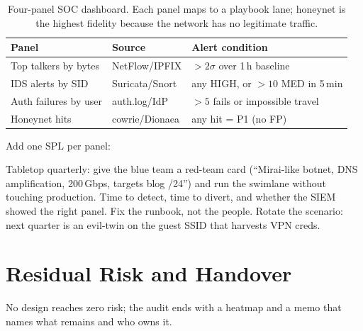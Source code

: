 \begin{table}[h]\centering\small
\begin{tabular}{l l l}
\toprule \textbf{Panel} & \textbf{Source} & \textbf{Alert condition} \\ \midrule
Top talkers by bytes & NetFlow/IPFIX & $>2\sigma$ over 1\,h baseline \\
IDS alerts by SID & Suricata/Snort & any HIGH, or $>10$ MED in 5\,min \\
Auth failures by user & auth.log/IdP & $>5$ fails or impossible travel \\
Honeynet hits & cowrie/Dionaea & any hit = P1 (no FP) \\ \bottomrule
\end{tabular}
\caption{Four-panel SOC dashboard. Each panel maps to a playbook lane; honeynet is the highest fidelity because the network has no legitimate traffic.}
\label{tab:dashboard}
\end{table}

Add one SPL per panel:


Tabletop quarterly: give the blue team a red-team card (``Mirai-like botnet, DNS amplification, 200\,Gbps, targets blog /24'') and run the swimlane without touching production. Time to detect, time to divert, and whether the SIEM showed the right panel. Fix the runbook, not the people. Rotate the scenario: next quarter is an evil-twin on the guest SSID that harvests VPN creds.

\section{Residual Risk and Handover}\label{sec:residual}
No design reaches zero risk; the audit ends with a heatmap and a memo that names what remains and who owns it.

